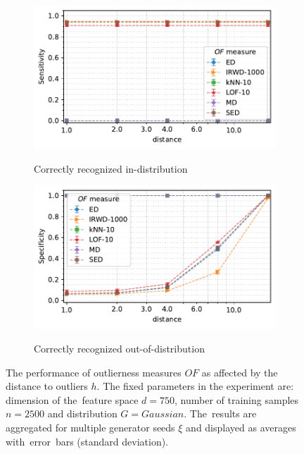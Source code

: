 \begin{figure}[t]
\begin{subfigure}[b]{0.495\textwidth}
        \centering
        \caption{\small Correctly recognized in-distribution}
        \includegraphics[width=\textwidth]{images/distributions/trends-h/trend-distributions-sens_95(distance)-dimension_750-samples_2500-distribution_gaussian-model_ED,IRWD-1000,kNN-10,LOF-10,MD,SED-aggregated (1).pdf}
        \label{fig:distance-sensitivity}
    \end{subfigure}
    \hfill
    \begin{subfigure}[b]{0.495\textwidth}
        \centering
        \caption{\small Correctly recognized out-of-distribution}
        \includegraphics[width=\textwidth]{images/distributions/trends-h/trend-distributions-spec_95(distance)-dimension_750-samples_2500-distribution_gaussian-model_ED,IRWD-1000,kNN-10,LOF-10,MD,SED-aggregated.pdf}
        \label{fig:distance-specificity}
    \end{subfigure}
    \caption{The performance of outlierness measures $OF$ as affected by the distance to outliers $h$. The fixed parameters in the experiment are: dimension of the~feature space $d = 750$, number of training samples $n = 2500$ and distribution $G = Gaussian$. The~results are aggregated for multiple generator seeds $\xi$ and displayed as averages with~error~bars (standard deviation).}
    \label{fig:distance}
    \vspace{-1.0em}
\end{figure}

\cleardoublepage{}
